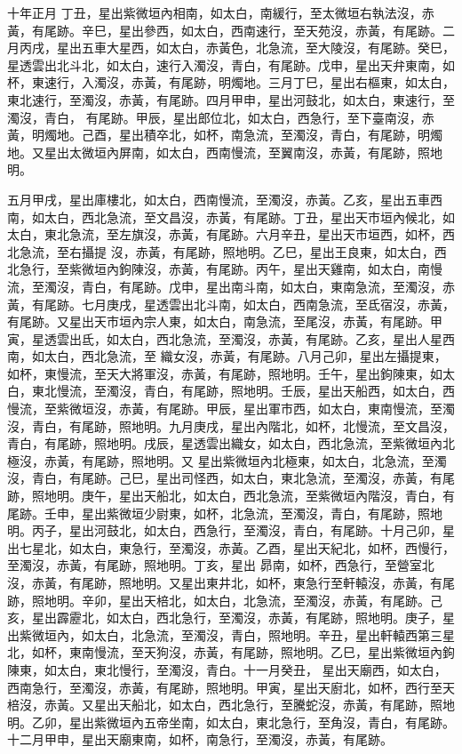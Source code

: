\begin{pinyinscope}
 十年正月
 丁丑，星出紫微垣內相南，如太白，南緩行，至太微垣右執法沒，赤黃，有尾跡。辛巳，星出參西，如太白，西南速行，至天苑沒，赤黃，有尾跡。二月丙戌，星出五車大星西，如太白，赤黃色，北急流，至大陵沒，有尾跡。癸巳，星透雲出北斗北，如太白，速行入濁沒，青白，有尾跡。戊申，星出天弁東南，如杯，東速行，入濁沒，赤黃，有尾跡，明燭地。三月丁巳，星出右樞東，如太白，東北速行，至濁沒，赤黃，有尾跡。四月甲申，星出河鼓北，如太白，東速行，至濁沒，青白，
 有尾跡。甲辰，星出郎位北，如太白，西急行，至下臺南沒，赤黃，明燭地。己酉，星出積卒北，如杯，南急流，至濁沒，青白，有尾跡，明燭地。又星出太微垣內屏南，如太白，西南慢流，至翼南沒，赤黃，有尾跡，照地明。



 五月甲戌，星出庫樓北，如太白，西南慢流，至濁沒，赤黃。乙亥，星出五車西南，如太白，西北急流，至文昌沒，赤黃，有尾跡。丁丑，星出天市垣內候北，如太白，東北急流，至左旗沒，赤黃，有尾跡。六月辛丑，星出天市垣西，如杯，西北急流，至右攝提
 沒，赤黃，有尾跡，照地明。乙巳，星出王良東，如太白，西北急行，至紫微垣內鉤陳沒，赤黃，有尾跡。丙午，星出天雞南，如太白，南慢流，至濁沒，青白，有尾跡。戊申，星出南斗南，如太白，東南急流，至濁沒，赤黃，有尾跡。七月庚戌，星透雲出北斗南，如太白，西南急流，至氐宿沒，赤黃，有尾跡。又星出天市垣內宗人東，如太白，南急流，至尾沒，赤黃，有尾跡。甲寅，星透雲出氐，如太白，西北急流，至濁沒，赤黃，有尾跡。乙亥，星出人星西南，如太白，西北急流，至
 織女沒，赤黃，有尾跡。八月己卯，星出左攝提東，如杯，東慢流，至天大將軍沒，赤黃，有尾跡，照地明。壬午，星出鉤陳東，如太白，東北慢流，至濁沒，青白，有尾跡，照地明。壬辰，星出天船西，如太白，西慢流，至紫微垣沒，赤黃，有尾跡。甲辰，星出軍市西，如太白，東南慢流，至濁沒，青白，有尾跡，照地明。九月庚戌，星出內階北，如杯，北慢流，至文昌沒，青白，有尾跡，照地明。戌辰，星透雲出織女，如太白，西北急流，至紫微垣內北極沒，赤黃，有尾跡，照地明。又
 星出紫微垣內北極東，如太白，北急流，至濁沒，青白，有尾跡。己巳，星出司怪西，如太白，東北急流，至濁沒，赤黃，有尾跡，照地明。庚午，星出天船北，如太白，西北急流，至紫微垣內階沒，青白，有尾跡。壬申，星出紫微垣少尉東，如杯，北急流，至濁沒，青白，有尾跡，照地明。丙子，星出河鼓北，如太白，西急行，至濁沒，青白，有尾跡。十月己卯，星出七星北，如太白，東急行，至濁沒，赤黃。乙酉，星出天紀北，如杯，西慢行，至濁沒，赤黃，有尾跡，照地明。丁亥，星出
 昴南，如杯，西急行，至營室北沒，赤黃，有尾跡，照地明。又星出東井北，如杯，東急行至軒轅沒，赤黃，有尾跡，照地明。辛卯，星出天棓北，如太白，北急流，至濁沒，赤黃，有尾跡。己亥，星出霹靂北，如太白，西北急行，至濁沒，赤黃，有尾跡，照地明。庚子，星出紫微垣內，如太白，北急流，至濁沒，青白，照地明。辛丑，星出軒轅西第三星北，如杯，東南慢流，至天狗沒，赤黃，有尾跡，照地明。乙巳，星出紫微垣內鉤陳東，如太白，東北慢行，至濁沒，青白。十一月癸丑，
 星出天廟西，如太白，西南急行，至濁沒，赤黃，有尾跡，照地明。甲寅，星出天廚北，如杯，西行至天棓沒，赤黃。又星出天船北，如太白，西北急行，至騰蛇沒，赤黃，有尾跡，照地明。乙卯，星出紫微垣內五帝坐南，如太白，東北急行，至角沒，青白，有尾跡。十二月甲申，星出天廟東南，如杯，南急行，至濁沒，赤黃，有尾跡。



\end{pinyinscope}